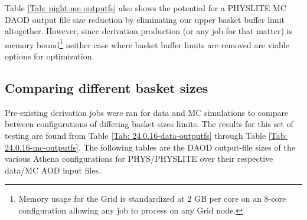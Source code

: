 \begin{table}[h]
    \label{tab:night-data-outputfs-nu}
    \centering
    \caption{Comparing the maximum proportional set size (PSS) and PHYS/PHYSLITE output file sizes (outFS) for data jobs while varying the presence of features in Athena PoolWriteConfig.py for 160327 entries.}
\end{table}

\vspace{15px}
Table \ref{Tab: night-mc-outputfs} also shows the potential for a PHYSLITE MC DAOD output file size reduction by eliminating our upper basket buffer limit altogether.  
However, since derivation production (or any job for that matter) is memory bound\footnote{Memory usage for the Grid is standardized at 2 GB per core on an 8-core configuration allowing any job to process on any Grid node.} neither case where basket buffer limits are removed are viable options for optimization. 

\subsection{Comparing different basket sizes}
\label{sec:DAODProd_Results_comparing}

Pre-existing derivation jobs were ran for data and MC simulations to compare between configurations of differing basket sizes limits. 
The results for this set of testing are found from Table \ref{Tab: 24.0.16-data-outputfs} through Table \ref{Tab: 24.0.16-mc-outputfs}. 
The following tables are the DAOD output-file sizes of the various Athena configurations for PHYS/PHYSLITE over their respective data/MC AOD input files. 
\vspace{15px}


\vspace{15px}

